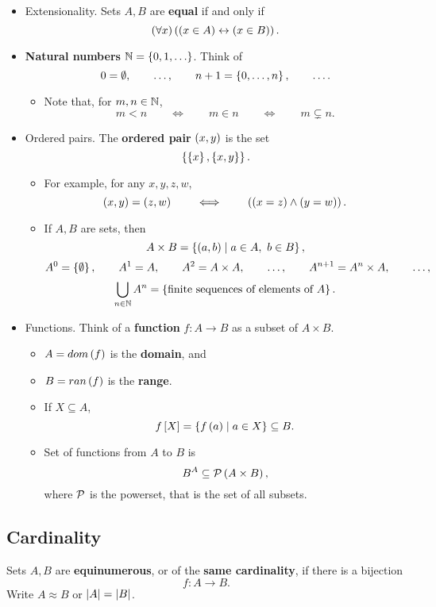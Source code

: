\begin{itemize}
\item Extensionality. Sets $ A, B $ are \textbf{equal} if and only if
$$ \left( \forall x \right)\left( \left( x \in A \right) \leftrightarrow \left( x \in B \right) \right). $$
\item \textbf{Natural numbers} $ \N = \cb{0, 1, \dots} $. Think of
$$ 0 = \emptyset, \qquad \dots, \qquad n + 1 = \left\{ 0, \dots, n \right\}, \qquad \dots. $$
\begin{itemize}
\item Note that, for $ m, n \in \mathbb{N} $,
$$ m < n \qquad \iff \qquad m \in n \qquad \iff \qquad m \subsetneq n. $$
\end{itemize}
\item Ordered pairs. The \textbf{ordered pair} $ \left( x, y \right) $ is the set
$$ \left\{ \left\{ x \right\}, \left\{ x, y \right\} \right\}. $$
\begin{itemize}
\item For example, for any $ x, y, z, w $,
$$ \left( x, y \right) = \left( z, w \right) \qquad \iff \qquad \left( \left( x = z \right) \land \left( y = w \right) \right). $$
\item If $ A, B $ are sets, then
$$ A \times B = \left\{ \left( a, b \right) \mid a \in A, \ b \in B \right\}, $$
$$ A^0 = \left\{ \emptyset \right\}, \qquad A^1 = A, \qquad A^2 = A \times A, \qquad \dots, \qquad A^{n + 1} = A^n \times A, \qquad \dots, $$
$$ \bigcup_{n \in \mathbb{N}} A^n = \left\{ \text{finite sequences of elements of} \ A \right\}. $$
\end{itemize}
\item Functions. Think of a \textbf{function} $ f : A \to B $ as a subset of $ A \times B $.
\begin{itemize}
\item $ A = dom\left( f \right) $ is the \textbf{domain}, and
\item $ B = ran\left( f \right) $ is the \textbf{range}.
\item If $ X \subseteq A $,
$$ f\left[ X \right] = \left\{ f\left( a \right) \mid a \in X \right\} \subseteq B. $$
\item Set of functions from $ A $ to $ B $ is
$$ B^A \subseteq \mathcal{P}\left( A \times B \right), $$
where $ \mathcal{P} $ is the powerset, that is the set of all subsets.
\end{itemize}
\end{itemize}

\subsection{Cardinality}

\begin{definition}
Sets $ A, B $ are \textbf{equinumerous}, or of the \textbf{same cardinality}, if there is a bijection
$$ f : A \to B. $$
Write $ A \approx B $ or $ \left\lvert A \right\rvert = \left\lvert B \right\rvert $.
\end{definition}

